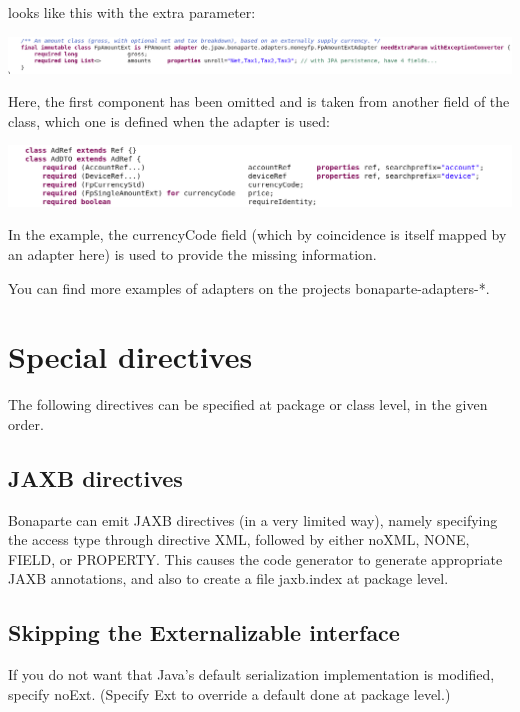 \documentclass[11pt,a4paper,oneside]{article}
\begin{document}
looks like this with the extra parameter:

\vspace{2mm}

\hspace{1cm}\includegraphics[scale=0.5]{images/tut1-adapter4.png}

Here, the first component has been omitted and is taken from another field of the class, which one is defined when the adapter
is used:

\vspace{2mm}

\hspace{1cm}\includegraphics[scale=0.5]{images/tut1-adapter5.png}

In the example, the {\ttfamily currencyCode} field (which by coincidence is itself mapped by an adapter here) is used to provide
the missing information.

You can find more examples of adapters on the projects {\ttfamily bonaparte-adapters-}*. 


\section{Special directives}
The following directives can be specified at package or class level, in the given order. 
\subsection{JAXB directives}
Bonaparte can emit JAXB directives (in a very limited way), namely specifying the access type through directive {\ttfamily XML}, followed
by either {\ttfamily noXML}, {\ttfamily NONE}, {\ttfamily FIELD}, or {\ttfamily PROPERTY}. This causes the code generator to generate
appropriate JAXB annotations, and also to create a file {\ttfamily jaxb.index} at package level.
 

\subsection{Skipping the {\ttfamily Externalizable} interface}
If you do not want that Java's default serialization implementation is modified, specify {\ttfamily noExt}. (Specify {\ttfamily Ext} to
override a default done at package level.)
\end{document}
